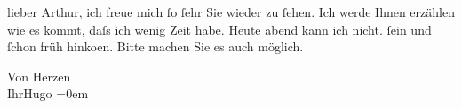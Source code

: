 \pstart
           \noindent{}{\pb}lieber Arthur, ich freue mich{ }ſo{ }ſehr Sie wieder zu{ }ſehen. Ich werde
               Ihnen erzählen wie es kommt, daſs ich wenig Zeit habe. Heute abend kann ich nicht.
               \label{K_L01081-1v}\label{K_L01081-1}{ }ſein und{ }ſchon früh hinko{\geminationm}en. Bitte machen Sie es auch möglich.\pend
           
\pstart
           Von Herzen{\\[\baselineskip]}Ihr\spacefill\mbox{Hugo}\pend
           \leftskip=0em{}\endnumbering{}  \newcommand{\dateiname}{L01081}\newcommand{\titel}{Hugo von Hofmannsthal an Arthur Schnitzler, 27. 10. 1900}\newcommand{\editorInnen}{Martin Anton Müller und Gerd-Hermann Susen}
